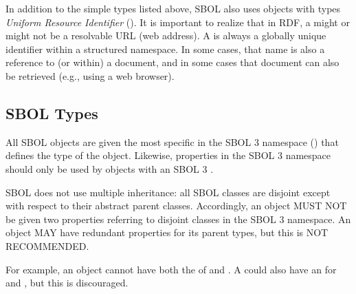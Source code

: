 In addition to the simple types listed above, SBOL also uses objects with types \emph{Uniform Resource Identifier} (). It is important to realize that in RDF, a  might or might not be a resolvable URL (web address).  A  is always a globally unique identifier within a structured namespace.  In some cases, that name is also a reference to (or within) a document, and in some cases that document can also be retrieved (e.g., using a web browser).

\subsection{SBOL Types}
\label{sec:sbolTypes}

All SBOL objects are given the most specific  in the SBOL 3 namespace () that defines the type of the object.
Likewise, properties in the SBOL 3 namespace should only be used by objects with an SBOL 3 .

SBOL does not use multiple inheritance: all SBOL classes are disjoint except with respect to their abstract parent classes.
Accordingly, an object MUST NOT be given two  properties referring to disjoint classes in the SBOL 3 namespace.
An object MAY have redundant  properties for its parent types, but this is NOT RECOMMENDED.

For example, an object cannot have both the  of  and .  
A  could also have an  for  and , but this is discouraged.
